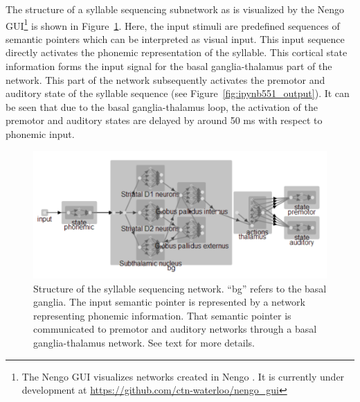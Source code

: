 \documentclass[conference]{IEEEtran}
\begin{document}
The structure of a syllable sequencing subnetwork
as is visualized by the Nengo GUI\footnote{
  The Nengo GUI visualizes networks created in Nengo
  \cite{bekolay2014}. It is currently under development
  at \url{https://github.com/ctn-waterloo/nengo_gui}}
is shown in Figure~\ref{fig:ipynb551_structure}.
Here, the input stimuli are predefined sequences of semantic pointers
which can be interpreted as visual input. This input sequence
directly activates the phonemic representation of the syllable.
This cortical state information forms the input signal for the
basal ganglia-thalamus part of the network. This part of the
network subsequently activates the premotor and auditory state
of the syllable sequence (see Figure~\ref{fig:ipynb551_output}).
It can be seen that due to the basal ganglia-thalamus loop,
the activation of the premotor and auditory states are delayed by
around 50 ms with respect to phonemic input.

\begin{figure}
\centering
\includegraphics[width=\columnwidth]{ipynb551_structure}
\caption{Structure of the syllable sequencing network. ``bg''
  refers to the basal ganglia. The input semantic pointer is
  represented by a network representing phonemic information.
  That semantic pointer is communicated to premotor and auditory
  networks through a basal ganglia-thalamus network. See text
  for more details.}
\label{fig:ipynb551_structure}
\end{figure}
\end{document}

